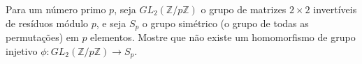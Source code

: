 Para um número primo \(p\), seja \(GL_2(\mathbb{Z}/p\mathbb{Z})\) o grupo de matrizes \(2 \times 2\) invertíveis de resíduos módulo \(p\), e seja \(S_p\) o grupo simétrico (o grupo de todas as permutações) em \(p\) elementos. Mostre que não existe um homomorfismo de grupo injetivo \(\phi \colon  GL_2(\mathbb{Z}/p\mathbb{Z}) \to S_p\).

